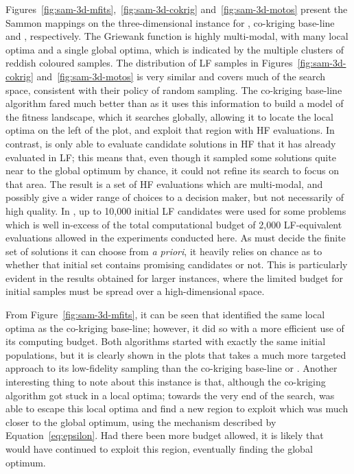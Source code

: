 Figures~\ref{fig:sam-3d-mfits},~\ref{fig:sam-3d-cokrig} and~\ref{fig:sam-3d-motos} present the Sammon mappings on the three-dimensional instance for \AlgName{}, co-kriging base-line and \motos{}, respectively. The Griewank function is highly multi-modal, with many local optima and a single global optima, which is indicated by the multiple clusters of reddish coloured samples. The distribution of LF samples in Figures~\ref{fig:sam-3d-cokrig} and~\ref{fig:sam-3d-motos} is very similar and covers much of the search space, consistent with their policy of random sampling. The co-kriging base-line algorithm fared much better than \motos{} as it uses this information to build a model of the fitness landscape, which it searches globally, allowing it to locate the local optima on the left of the plot, and exploit that region with HF evaluations. In contrast, \motos{} is only able to evaluate candidate solutions in HF that it has already evaluated in LF; this means that, even though it sampled some solutions quite near to the global optimum by chance, it could not refine its search to focus on that area. The result is a set of HF evaluations which are multi-modal, and possibly give a wider range of choices to a decision maker, but not necessarily of high quality. In \cite{xu2016mo2tos}, up to 10,000 initial LF candidates were used for some problems which is well in-excess of the total computational budget of 2,000 LF-equivalent evaluations allowed in the experiments conducted here. As \motos{} must decide the finite set of solutions it can choose from \emph{a priori}, it heavily relies on chance as to whether that initial set contains promising candidates or not. This is particularly evident in the results obtained for larger instances, where the limited budget for initial samples must be spread over a high-dimensional space.%

From Figure~\ref{fig:sam-3d-mfits}, it can be seen that \AlgName{} identified the same local optima as the co-kriging base-line; however, it did so with a more efficient use of its computing budget. Both algorithms started with exactly the same initial populations, but it is clearly shown in the plots that \AlgName{} takes a much more targeted approach to its low-fidelity sampling than the co-kriging base-line or \motos{}. Another interesting thing to note about this instance is that, although the co-kriging algorithm got stuck in a local optima; towards the very end of the search, \AlgName{} was able to escape this local optima and find a new region to exploit which was much closer to the global optimum, using the mechanism described by Equation~\ref{eq:epsilon}. Had there been more budget allowed, it is likely that \AlgName{} would have continued to exploit this region, eventually finding the global optimum. 

